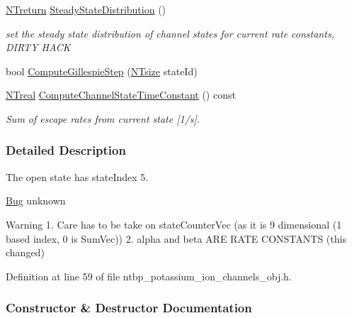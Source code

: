 \begin{DoxyCompactItemize}
\item 
\hyperlink{nt__types_8h_ab9564ee8f091e809d21b8451c6683c53}{NTreturn} \hyperlink{class_n_t_b_p__potassium__ion__channels__o_ad6366a99e20e95aa928918ce17b5fd7b}{SteadyStateDistribution} ()
\begin{DoxyCompactList}\small\item\em set the steady state distribution of channel states for current rate constants, DIRTY HACK \item\end{DoxyCompactList}\item 
bool \hyperlink{class_n_t_b_p__potassium__ion__channels__o_a4f786d5e22e15720f2bb7f24de206c2e}{ComputeGillespieStep} (\hyperlink{nt__types_8h_a06c124f2e4469769b58230253ce0560b}{NTsize} stateId)
\item 
\hyperlink{nt__types_8h_a814a97893e9deb1eedcc7604529ba80d}{NTreal} \hyperlink{class_n_t_b_p__potassium__ion__channels__o_ae946df665a34cfa7042c6ce9a49a1c59}{ComputeChannelStateTimeConstant} () const 
\begin{DoxyCompactList}\small\item\em Sum of escape rates from current state \mbox{[}1/s\mbox{]}. \item\end{DoxyCompactList}\end{DoxyCompactItemize}


\subsubsection{Detailed Description}
The open state has stateIndex 5. \begin{Desc}
\item[\hyperlink{bug__bug000076}{Bug}]unknown \end{Desc}
\begin{DoxyWarning}{Warning}
1. Care has to be take on stateCounterVec (as it is 9 dimensional (1 based index, 0 is SumVec)) 2. alpha and beta ARE RATE CONSTANTS (this changed) 
\end{DoxyWarning}


Definition at line 59 of file ntbp\_\-potassium\_\-ion\_\-channels\_\-obj.h.



\subsubsection{Constructor \& Destructor Documentation}
